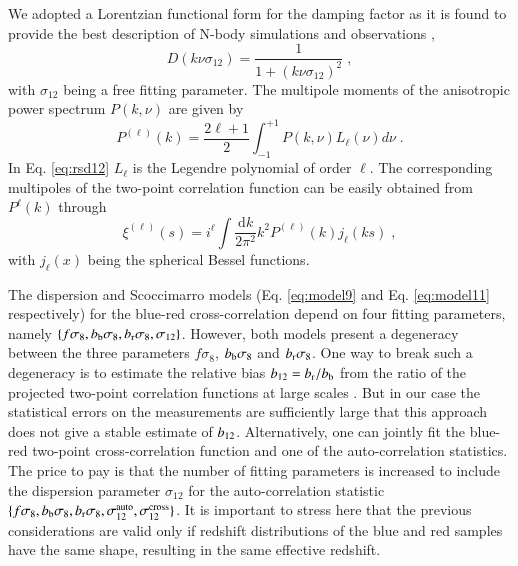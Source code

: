 \documentclass[longauth]{aa}
\def\({\left(}
\def\){\right)}
\newcommand{\dd}{\mathrm{d}}
\begin{document}
We adopted a Lorentzian functional form for the damping factor as it is found to provide the best description of N-body simulations and observations \citep{Zurek94,delatorre12,pezzotta16},
	\begin{equation}
		D\(k\nu\sigma_{12}\) = \frac{1}{1+\(k\nu\sigma_{12}\)^2}\; ,					\label{eq:model12}
	\end{equation}
with $\sigma_{12}$ being a free fitting parameter. The multipole moments of the anisotropic power spectrum $P\(k,\nu\)$ are given by
	\begin{equation}
		P^{\(\ell\)}\(k\) = \frac{2\ell+1}{2}\int_{-1}^{+1}P\(k,\nu\)L_{\ell}\(\nu\)d\nu\; .			\label{eq:rsd12}
	\end{equation}
In Eq. \eqref{eq:rsd12} $L_{\ell}$ is the Legendre polynomial of order $\ell$. The corresponding multipoles of the two-point correlation function can be easily obtained from $P^{\ell}\(k\)$ through
	\begin{equation}
		\xi^{\(\ell\)}\(s\) = i^\ell\int\frac{\dd k}{2\pi^2}k^2P^{\(\ell\)}\(k\)j_{\ell}\(ks\)\; ,																				\label{eq:rsd13}
	\end{equation}
with $j_\ell\(x\)$ being the spherical Bessel functions.

The dispersion and Scoccimarro models (Eq. \ref{eq:model9} and Eq. \ref{eq:model11} respectively) for the blue-red cross-correlation depend on four fitting parameters, namely $\{f\sigma_8,b_{\rm{b}}\sigma_8,b_{\rm{r}}\sigma_8,\sigma_{12}\}$. However, both models present a degeneracy between the three parameters $f\sigma_8$, $b_{\rm{b}}\sigma_8$ and $b_{\rm{r}}\sigma_8$. One way to break such a degeneracy is to estimate the relative bias $b_{\rm{12}}=b_{\rm{r}}/b_{\rm{b}}$ from the ratio of the projected two-point correlation functions at large  scales \citep{mohammad16}. But in our case the statistical errors on the measurements are sufficiently large that this approach does not give a stable estimate of $b_{\rm{12}}$. Alternatively, one can jointly fit the blue-red two-point cross-correlation function and one of the auto-correlation statistics. The price to pay is that the number of fitting parameters is increased to include the dispersion parameter $\sigma_{12}$ for the auto-correlation statistic $\{f\sigma_8,b_{\rm{b}}\sigma_8,b_{\rm{r}}\sigma_8,\sigma_{12}^{\rm{auto}},\sigma_{12}^{\rm{cross}}\}$. It is important to stress here that the previous considerations are valid only if redshift distributions of the blue and red samples have the same shape, resulting in the same effective redshift.
\end{document}
